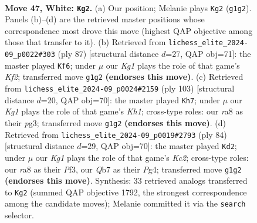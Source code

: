 \documentclass[11pt]{article}
\begin{document}
\clearpage

\begin{figure}[p]\centering
\begin{subfigure}{0.46\textwidth}\centering
\resizebox{\linewidth}{!}{%
\newchessgame
\chessboard[
  setfen={r7/1Q6/4kp2/3p4/5P2/p5P1/P6P/4q1K1 w - - 13 47},
  showmover=false,
  pgfstyle=straightmove, color=movearrow, markmove={g1-g2}
]}
\caption{}
\end{subfigure}\hfill
\begin{subfigure}{0.46\textwidth}\centering
\resizebox{\linewidth}{!}{%
\newchessgame
\chessboard[
  setfen={8/3Q1k1p/6p1/8/7P/3p2PK/1P2q3/8 b - - 3 44},
  showmover=false,
  pgfstyle=straightmove, color=movearrow, markmove={f7-f6}
]}
\caption{}
\end{subfigure}
\\[4pt]
\begin{subfigure}{0.46\textwidth}\centering
\resizebox{\linewidth}{!}{%
\newchessgame
\chessboard[
  setfen={5Q1k/1p4p1/7p/pP6/q6P/5KP1/8/8 b - - 3 52},
  showmover=false,
  pgfstyle=straightmove, color=movearrow, markmove={h8-h7}
]}
\caption{}
\end{subfigure}\hfill
\begin{subfigure}{0.46\textwidth}\centering
\resizebox{\linewidth}{!}{%
\newchessgame
\chessboard[
  setfen={6Q1/2pk1pp1/1p5p/7P/q2P2P1/2P2P2/2K5/8 w - - 0 43},
  showmover=false,
  pgfstyle=straightmove, color=movearrow, markmove={c2-d2}
]}
\caption{}
\end{subfigure}
\caption{\textbf{Move 47, White: \texttt{Kg2}.} (a) Our position; Melanie plays \texttt{Kg2} (\texttt{g1g2}). Panels (b)--(d) are the retrieved master positions whose correspondence most drove this move (highest QAP objective among those that transfer to it). (b) Retrieved from \texttt{lichess\_elite\_2024-09\_p0022\#303} (ply 87) [structural distance $d$=27, QAP obj=71]: the master played \texttt{Kf6}; under $\mu$ our \emph{Kg1} plays the role of that game's \emph{Kf2}; transferred move \texttt{g1g2} \textbf{(endorses this move)}. (c) Retrieved from \texttt{lichess\_elite\_2024-09\_p0024\#2159} (ply 103) [structural distance $d$=20, QAP obj=70]: the master played \texttt{Kh7}; under $\mu$ our \emph{Kg1} plays the role of that game's \emph{Kh1}; cross-type roles: our \emph{r}a8 as their \emph{p}g3; transferred move \texttt{g1g2} \textbf{(endorses this move)}. (d) Retrieved from \texttt{lichess\_elite\_2024-09\_p0019\#2793} (ply 84) [structural distance $d$=29, QAP obj=70]: the master played \texttt{Kd2}; under $\mu$ our \emph{Kg1} plays the role of that game's \emph{Kc2}; cross-type roles: our \emph{r}a8 as their \emph{P}f3, our \emph{Q}b7 as their \emph{P}g4; transferred move \texttt{g1g2} \textbf{(endorses this move)}. Synthesis: 33 retrieved analogs transferred to \texttt{Kg2} (summed QAP objective 1792, the strongest correspondence among the candidate moves); Melanie committed it via the \texttt{search} selector.}
\label{fig:thought-m92}
\end{figure}
\end{document}
